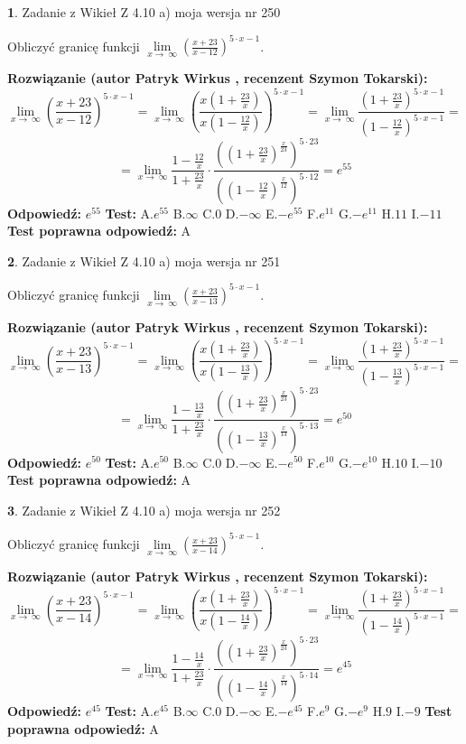 \documentclass[12pt, a4paper]{article}
\theoremstyle{definition} %
\newtheorem{zad}{}
\newcommand{\zadStart}[1]{\begin{zad}#1\newline}
\newcommand{\zadStop}{\end{zad}}
\newcommand{\rozwStart}[2]{\noindent \textbf{Rozwiązanie (autor #1 , recenzent #2): }\newline}
\newcommand{\rozwStop}{\newline}
\newcommand{\odpStart}{\noindent \textbf{Odpowiedź:}\newline}
\newcommand{\odpStop}{\newline}
\newcommand{\testStart}{\noindent \textbf{Test:}\newline}
\newcommand{\testStop}{\newline}
\newcommand{\kluczStart}{\noindent \textbf{Test poprawna odpowiedź:}\newline}
\newcommand{\kluczStop}{\newline}
\begin{document}
\zadStart{Zadanie z Wikieł Z 4.10 a) moja wersja nr 250}

Obliczyć granicę funkcji  $\lim\limits_{x\to\ \infty}(\frac{x+23}{x-12})^{5\cdot x-1}$.
\zadStop
\rozwStart{Patryk Wirkus}{Szymon Tokarski}
$$\lim\limits_{x\to\ \infty}(\frac{x+23}{x-12})^{5\cdot x-1} = \lim\limits_{x\to\ \infty}(\frac{x(1+\frac{23}{x})}{x(1-\frac{12}{x})})^{5\cdot x-1}=\lim\limits_{x\to\ \infty}\frac{(1+\frac{23}{x})^{5\cdot x-1}}{(1-\frac{12}{x})^{5\cdot x-1}}=$$
$$=\lim\limits_{x\to\ \infty}\frac{1-\frac{12}{x}}{1+\frac{23}{x}}\cdot\frac{((1+\frac{23}{x})^{\frac{x}{23}})^{5\cdot23}}{((1-\frac{12}{x})^{\frac{x}{12}})^{5\cdot12}}=e^{55}$$
\rozwStop
\odpStart
$e^{55}$
\odpStop
\testStart
A.$e^{55}$ B.$\infty$ C.$0$ D.$-\infty$ E.$-e^{55}$
F.$e^{11}$ G.$-e^{11}$
H.$11$
I.$-11$
\testStop
\kluczStart
A
\kluczStop



\zadStart{Zadanie z Wikieł Z 4.10 a) moja wersja nr 251}

Obliczyć granicę funkcji  $\lim\limits_{x\to\ \infty}(\frac{x+23}{x-13})^{5\cdot x-1}$.
\zadStop
\rozwStart{Patryk Wirkus}{Szymon Tokarski}
$$\lim\limits_{x\to\ \infty}(\frac{x+23}{x-13})^{5\cdot x-1} = \lim\limits_{x\to\ \infty}(\frac{x(1+\frac{23}{x})}{x(1-\frac{13}{x})})^{5\cdot x-1}=\lim\limits_{x\to\ \infty}\frac{(1+\frac{23}{x})^{5\cdot x-1}}{(1-\frac{13}{x})^{5\cdot x-1}}=$$
$$=\lim\limits_{x\to\ \infty}\frac{1-\frac{13}{x}}{1+\frac{23}{x}}\cdot\frac{((1+\frac{23}{x})^{\frac{x}{23}})^{5\cdot23}}{((1-\frac{13}{x})^{\frac{x}{13}})^{5\cdot13}}=e^{50}$$
\rozwStop
\odpStart
$e^{50}$
\odpStop
\testStart
A.$e^{50}$ B.$\infty$ C.$0$ D.$-\infty$ E.$-e^{50}$
F.$e^{10}$ G.$-e^{10}$
H.$10$
I.$-10$
\testStop
\kluczStart
A
\kluczStop



\zadStart{Zadanie z Wikieł Z 4.10 a) moja wersja nr 252}

Obliczyć granicę funkcji  $\lim\limits_{x\to\ \infty}(\frac{x+23}{x-14})^{5\cdot x-1}$.
\zadStop
\rozwStart{Patryk Wirkus}{Szymon Tokarski}
$$\lim\limits_{x\to\ \infty}(\frac{x+23}{x-14})^{5\cdot x-1} = \lim\limits_{x\to\ \infty}(\frac{x(1+\frac{23}{x})}{x(1-\frac{14}{x})})^{5\cdot x-1}=\lim\limits_{x\to\ \infty}\frac{(1+\frac{23}{x})^{5\cdot x-1}}{(1-\frac{14}{x})^{5\cdot x-1}}=$$
$$=\lim\limits_{x\to\ \infty}\frac{1-\frac{14}{x}}{1+\frac{23}{x}}\cdot\frac{((1+\frac{23}{x})^{\frac{x}{23}})^{5\cdot23}}{((1-\frac{14}{x})^{\frac{x}{14}})^{5\cdot14}}=e^{45}$$
\rozwStop
\odpStart
$e^{45}$
\odpStop
\testStart
A.$e^{45}$ B.$\infty$ C.$0$ D.$-\infty$ E.$-e^{45}$
F.$e^{9}$ G.$-e^{9}$
H.$9$
I.$-9$
\testStop
\kluczStart
A
\kluczStop
\end{document}
